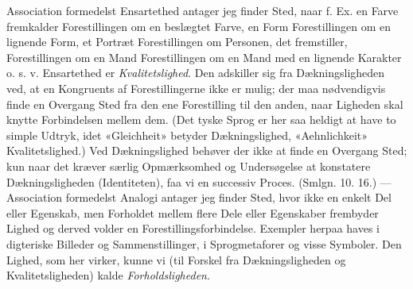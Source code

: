 \documentclass[12pt,a4paper,openany]{book}
\newcommand{\opage}[1]{\marginnote{\footnotesize\textit{[#1]}}}
\begin{document}
Association formedelst Ensartethed antager jeg finder Sted, naar f. Ex. en
Farve fremkalder Forestillingen om en beslægtet Farve, en Form Forestillingen
om en lignende Form, et Portræt Forestillingen om Personen, det fremstiller,
Forestillingen om en Mand Forestillingen om en Mand med en lignende Karakter o.
s. v. Ensartethed er \emph{Kvalitetslighed}. Den adskiller sig fra
Dækningsligheden ved, at en Kongruents af Forestillingerne ikke er mulig; der
maa nødvendigvis finde en Overgang Sted fra den ene Forestilling til
\setcounter{footnote}{0}%
\opage{43}den anden, naar Ligheden skal knytte Forbindelsen mellem dem. (Det
tyske Sprog er her saa heldigt at have to simple Udtryk, idet «Gleichheit»
betyder Dækningslighed, «Aehnlichkeit» Kvalitetslighed.) Ved Dækningslighed
behøver der ikke at finde en Overgang Sted; kun naar det kræver særlig
Opmærksomhed og Undersøgelse at konstatere Dækningsligheden (Identiteten), faa
vi en successiv Proces. (Smlgn. 10. 16.) --- Association formedelst Analogi
antager jeg finder Sted, hvor ikke en enkelt Del eller Egenskab, men Forholdet
mellem flere Dele eller Egenskaber frembyder Lighed og derved volder en
Forestillingsforbindelse. Exempler herpaa haves i digteriske Billeder og
Sammenstillinger, i Sprogmetaforer og visse Symboler. Den Lighed, som her
virker, kunne vi (til Forskel fra Dækningsligheden og Kvalitetsligheden) kalde
\emph{Forholdsligheden}.
\end{document}
